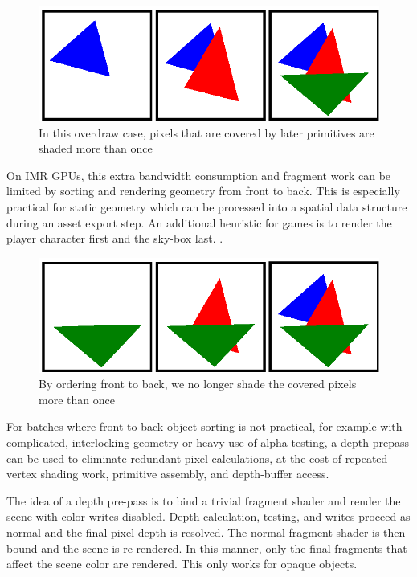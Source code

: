 \begin{figure}[h!]
    \caption{In this overdraw case, pixels that are covered by later primitives are shaded more than once}
    \centering
        \includegraphics{mccaffreyFigs/default_order.eps}
\end{figure}

On IMR GPUs, this extra bandwidth consumption and fragment work can be limited
by sorting and rendering geometry from front to back.  This is especially
practical for static geometry which can be processed into a spatial data
structure during an asset export step.  An additional heuristic for games is to
render the player character first and the sky-box last.
\cite{Pranckevicius11a}.  

\begin{figure}[h!]
    \caption{By ordering front to back, we no longer shade the covered pixels more than once}
    \centering
        \includegraphics{mccaffreyFigs/order_front_to_back.eps}
\end{figure}

For batches where front-to-back object sorting is not
practical, for example with complicated, interlocking geometry or heavy use of
alpha-testing, a depth prepass can be used to eliminate redundant pixel
calculations, at the cost of repeated vertex shading work, primitive assembly,
and depth-buffer access.

The idea of a depth pre-pass is to bind a trivial fragment shader and render
the scene with color writes disabled.  Depth calculation, testing, and writes
proceed as normal and the final pixel depth is resolved.  The normal
fragment shader is then bound and the scene is re-rendered.  In this manner,
only the final fragments that affect the scene color are rendered.  This only
works for opaque objects.

